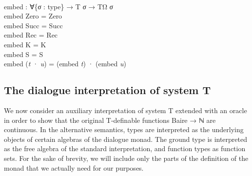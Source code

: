 \documentclass{entcs} \usepackage{prentcsmacro}
\newcommand{\AgdaC}[1]{\mbox{#1}}
\newcommand{\AgdaFontStyle}[1]{\textsf{#1}}
\newcommand{\AgdaBoundFontStyle}[1]{\textit{#1}}
\newcommand{\AgdaSymbol}      [1]{\textcolor{AgdaSymbol}{#1}}
\newcommand{\AgdaBound}    [1]{\AgdaBoundFontStyle{\textcolor{AgdaBound}{#1}}}
\newcommand{\AgdaInductiveConstructor}[1]
    {\AgdaFontStyle{\textcolor{AgdaInductiveConstructor}{#1}}}
\newcommand{\AgdaDatatype} [1]{\AgdaFontStyle{\textcolor{AgdaDatatype}{#1}}}
\newcommand{\AgdaFunction} [1]{\AgdaFontStyle{\textcolor{AgdaFunction}{#1}}}
\newcommand{\AgdaCodeStyle}{\small}
\newenvironment{code}%
{\noindent\AgdaCodeStyle\pboxed}%
{\endpboxed\par\noindent%
\ignorespacesafterend}
\begin{document}
\begin{code}\>\<%
\\
\>\AgdaFunction{embed} \AgdaSymbol{:} \AgdaSymbol{∀\{}\AgdaBound{σ} \AgdaSymbol{:} \AgdaDatatype{type}\AgdaSymbol{\}} \AgdaSymbol{→} \AgdaDatatype{T} \AgdaBound{σ} \AgdaSymbol{→} \AgdaDatatype{TΩ} \AgdaBound{σ}\<%
\\
\>\AgdaFunction{embed} \AgdaInductiveConstructor{Zero} \AgdaSymbol{=} \AgdaInductiveConstructor{Zero}\<%
\\
\>\AgdaFunction{embed} \AgdaInductiveConstructor{Succ} \AgdaSymbol{=} \AgdaInductiveConstructor{Succ}\<%
\\
\>\AgdaFunction{embed} \AgdaInductiveConstructor{Rec} \AgdaSymbol{=} \AgdaInductiveConstructor{Rec}\<%
\\
\>\AgdaFunction{embed} \AgdaInductiveConstructor{K} \AgdaSymbol{=} \AgdaInductiveConstructor{K}\<%
\\
\>\AgdaFunction{embed} \AgdaInductiveConstructor{S} \AgdaSymbol{=} \AgdaInductiveConstructor{S}\<%
\\
\>\AgdaFunction{embed} \AgdaSymbol{(}\AgdaBound{t} \AgdaInductiveConstructor{·} \AgdaBound{u}\AgdaSymbol{)} \AgdaSymbol{=} \AgdaSymbol{(}\AgdaFunction{embed} \AgdaBound{t}\AgdaSymbol{)} \AgdaInductiveConstructor{·} \AgdaSymbol{(}\AgdaFunction{embed} \AgdaBound{u}\AgdaSymbol{)}\<%
\\
\>\<\end{code}

\subsection{The dialogue interpretation of system \AgdaC{T}} \label{section:dialogue:interpretation}

We now consider an auxiliary interpretation of system T extended with
an oracle in order to show that the original T-definable functions
Baire → ℕ are continuous.  In the alternative semantics, types are
interpreted as the underlying objects of certain algebras of the
dialogue monad. The ground type is interpreted as the free algebra of
the standard interpretation, and function types as function sets.  For
the sake of brevity, we will include only the parts of the definition
of the monad that we actually need for our purposes.
\end{document}
